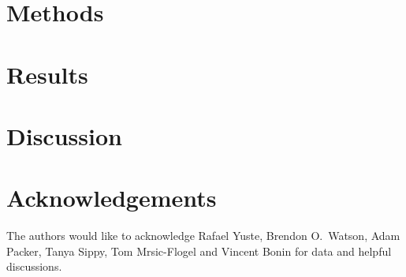 \documentclass[aoas,preprint]{imsart}
\begin{document}
\section{Methods}
\label{sec:methods}



\section{Results}
\label{sec:results}


\section{Discussion}
\label{sec:discussion}


\section*{Acknowledgements}
The authors would like to acknowledge Rafael Yuste, Brendon O.\ Watson, Adam Packer, Tanya Sippy, Tom Mrsic-Flogel and Vincent Bonin for data and helpful discussions.


% 

\end{document}
